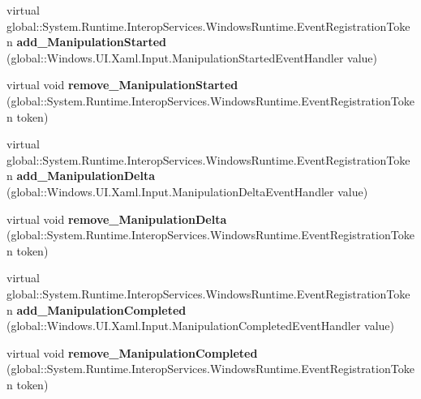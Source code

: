 \begin{DoxyCompactItemize}
virtual global\+::\+System.\+Runtime.\+Interop\+Services.\+Windows\+Runtime.\+Event\+Registration\+Token {\bfseries add\+\_\+\+Manipulation\+Started} (global\+::\+Windows.\+U\+I.\+Xaml.\+Input.\+Manipulation\+Started\+Event\+Handler value)
\item 
\mbox{\label{class_windows_1_1_u_i_1_1_xaml_1_1_u_i_element_af6ad67fc431c2034b4431d6cf4776b22}} 
virtual void {\bfseries remove\+\_\+\+Manipulation\+Started} (global\+::\+System.\+Runtime.\+Interop\+Services.\+Windows\+Runtime.\+Event\+Registration\+Token token)
\item 
\mbox{\label{class_windows_1_1_u_i_1_1_xaml_1_1_u_i_element_ac039d3e48cf74001e79d9a00893c2fb0}} 
virtual global\+::\+System.\+Runtime.\+Interop\+Services.\+Windows\+Runtime.\+Event\+Registration\+Token {\bfseries add\+\_\+\+Manipulation\+Delta} (global\+::\+Windows.\+U\+I.\+Xaml.\+Input.\+Manipulation\+Delta\+Event\+Handler value)
\item 
\mbox{\label{class_windows_1_1_u_i_1_1_xaml_1_1_u_i_element_aba1edd03abe3a079446b00630ed5e5ce}} 
virtual void {\bfseries remove\+\_\+\+Manipulation\+Delta} (global\+::\+System.\+Runtime.\+Interop\+Services.\+Windows\+Runtime.\+Event\+Registration\+Token token)
\item 
\mbox{\label{class_windows_1_1_u_i_1_1_xaml_1_1_u_i_element_a977eb5bb8e170069cf88e863a41c5bb5}} 
virtual global\+::\+System.\+Runtime.\+Interop\+Services.\+Windows\+Runtime.\+Event\+Registration\+Token {\bfseries add\+\_\+\+Manipulation\+Completed} (global\+::\+Windows.\+U\+I.\+Xaml.\+Input.\+Manipulation\+Completed\+Event\+Handler value)
\item 
\mbox{\label{class_windows_1_1_u_i_1_1_xaml_1_1_u_i_element_a7c48548622512fe1236390a569a15e25}} 
virtual void {\bfseries remove\+\_\+\+Manipulation\+Completed} (global\+::\+System.\+Runtime.\+Interop\+Services.\+Windows\+Runtime.\+Event\+Registration\+Token token)
\item 
\mbox{\label{class_windows_1_1_u_i_1_1_xaml_1_1_u_i_element_af682a477dc1f76b91d264ebf62e93325}} 

\end{DoxyCompactItemize}
